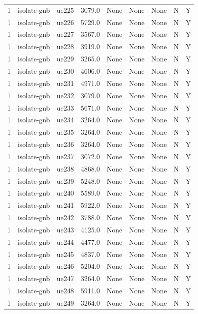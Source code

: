 \begin{table}[ht]
\begin{tabular}{|c|c|c|c|c|c|c|c|c|}
1 & isolate-gnb & ue225 & 3079.0 & None & None & None & N & Y \\
1 & isolate-gnb & ue226 & 5729.0 & None & None & None & N & Y \\
1 & isolate-gnb & ue227 & 3567.0 & None & None & None & N & Y \\
1 & isolate-gnb & ue228 & 3919.0 & None & None & None & N & Y \\
1 & isolate-gnb & ue229 & 3265.0 & None & None & None & N & Y \\
1 & isolate-gnb & ue230 & 4606.0 & None & None & None & N & Y \\
1 & isolate-gnb & ue231 & 4971.0 & None & None & None & N & Y \\
1 & isolate-gnb & ue232 & 3079.0 & None & None & None & N & Y \\
1 & isolate-gnb & ue233 & 5671.0 & None & None & None & N & Y \\
1 & isolate-gnb & ue234 & 3264.0 & None & None & None & N & Y \\
1 & isolate-gnb & ue235 & 3264.0 & None & None & None & N & Y \\
1 & isolate-gnb & ue236 & 3264.0 & None & None & None & N & Y \\
1 & isolate-gnb & ue237 & 3072.0 & None & None & None & N & Y \\
1 & isolate-gnb & ue238 & 4868.0 & None & None & None & N & Y \\
1 & isolate-gnb & ue239 & 5248.0 & None & None & None & N & Y \\
1 & isolate-gnb & ue240 & 5589.0 & None & None & None & N & Y \\
1 & isolate-gnb & ue241 & 5922.0 & None & None & None & N & Y \\
1 & isolate-gnb & ue242 & 3788.0 & None & None & None & N & Y \\
1 & isolate-gnb & ue243 & 4125.0 & None & None & None & N & Y \\
1 & isolate-gnb & ue244 & 4477.0 & None & None & None & N & Y \\
1 & isolate-gnb & ue245 & 4837.0 & None & None & None & N & Y \\
1 & isolate-gnb & ue246 & 5204.0 & None & None & None & N & Y \\
1 & isolate-gnb & ue247 & 3264.0 & None & None & None & N & Y \\
1 & isolate-gnb & ue248 & 5911.0 & None & None & None & N & Y \\
1 & isolate-gnb & ue249 & 3264.0 & None & None & None & N & Y \\

\end{tabular}
\end{table}

